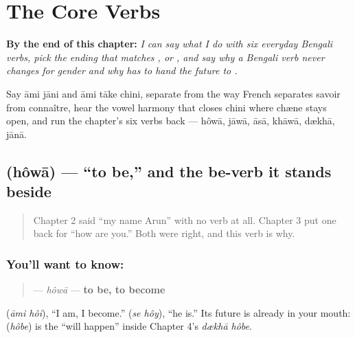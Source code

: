 
\chapter{The Core Verbs}
\label{ch:bn-core-verbs}

\begin{chapteropening}
\textbf{By the end of this chapter:} \emph{I can say what I do with six everyday Bengali verbs, pick the ending that matches ,  or , and say why a Bengali verb never changes for gender and why  has to hand the future to .}

Say āmi jāni and āmi tāke chini, separate  from  the way French separates savoir from connaître, hear the vowel harmony that closes chini where chæne stays open, and run the chapter's six verbs back — hôwā, jāwā, āsā, khāwā, dækhā, jānā.
\end{chapteropening}

\section[hôwā]{ (hôwā) — \textquotedblleft{}to be,\textquotedblright{} and the be-verb it stands beside}

\label{lesson:BN-C07-howa}



\begin{quote}
Chapter 2 said \textquotedblleft{}my name Arun\textquotedblright{} with no verb at all. Chapter 3 put one back for \textquotedblleft{}how are you.\textquotedblright{} Both were right, and this verb is why.
\end{quote}

\subsection*{You'll want to know: }
\begin{quote}
\textbf{} — \emph{hôwā} — \textbf{to be, to become}
\end{quote}

  (\emph{āmi hôi}), \textquotedblleft{}I am, I become.\textquotedblright{}   (\emph{se hôy}), \textquotedblleft{}he is.\textquotedblright{} Its future is already in your mouth: \textbf{} (\emph{hôbe}) is the \textquotedblleft{}will happen\textquotedblright{} inside Chapter 4's \emph{dækhā hôbe}.

